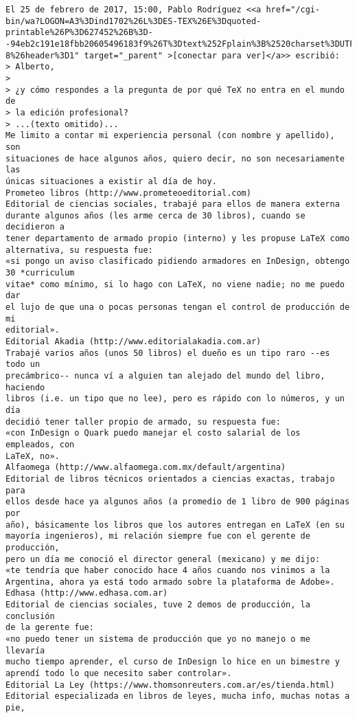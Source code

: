 \documentclass[a4paper,10pt]{article}
\begin{document}
\begin{lstlisting}
El 25 de febrero de 2017, 15:00, Pablo Rodríguez <<a href="/cgi-bin/wa?LOGON=A3%3Dind1702%26L%3DES-TEX%26E%3Dquoted-printable%26P%3D627452%26B%3D--94eb2c191e18fbb20605496183f9%26T%3Dtext%252Fplain%3B%2520charset%3DUTF-8%26header%3D1" target="_parent" >[conectar para ver]</a>> escribió:
> Alberto,
>
> ¿y cómo respondes a la pregunta de por qué TeX no entra en el mundo de
> la edición profesional?
> ...(texto omitido)...
Me limito a contar mi experiencia personal (con nombre y apellido), son
situaciones de hace algunos años, quiero decir, no son necesariamente las
únicas situaciones a existir al día de hoy.
Prometeo libros (http://www.prometeoeditorial.com)
Editorial de ciencias sociales, trabajé para ellos de manera externa
durante algunos años (les arme cerca de 30 libros), cuando se decidieron a
tener departamento de armado propio (interno) y les propuse LaTeX como
alternativa, su respuesta fue:
«si pongo un aviso clasificado pidiendo armadores en InDesign, obtengo
30 *curriculum
vitae* como mínimo, si lo hago con LaTeX, no viene nadie; no me puedo dar
el lujo de que una o pocas personas tengan el control de producción de mi
editorial».
Editorial Akadia (http://www.editorialakadia.com.ar)
Trabajé varios años (unos 50 libros) el dueño es un tipo raro --es todo un
precámbrico-- nunca ví a alguien tan alejado del mundo del libro, haciendo
libros (i.e. un tipo que no lee), pero es rápido con lo números, y un día
decidió tener taller propio de armado, su respuesta fue:
«con InDesign o Quark puedo manejar el costo salarial de los empleados, con
LaTeX, no».
Alfaomega (http://www.alfaomega.com.mx/default/argentina)
Editorial de libros técnicos orientados a ciencias exactas, trabajo para
ellos desde hace ya algunos años (a promedio de 1 libro de 900 páginas por
año), básicamente los libros que los autores entregan en LaTeX (en su
mayoría ingenieros), mi relación siempre fue con el gerente de producción,
pero un día me conoció el director general (mexicano) y me dijo:
«te tendría que haber conocido hace 4 años cuando nos vinimos a la
Argentina, ahora ya está todo armado sobre la plataforma de Adobe».
Edhasa (http://www.edhasa.com.ar)
Editorial de ciencias sociales, tuve 2 demos de producción, la conclusión
de la gerente fue:
«no puedo tener un sistema de producción que yo no manejo o me llevaría
mucho tiempo aprender, el curso de InDesign lo hice en un bimestre y
aprendí todo lo que necesito saber controlar».
Editorial La Ley (https://www.thomsonreuters.com.ar/es/tienda.html)
Editorial especializada en libros de leyes, mucha info, muchas notas a pie,

\end{lstlisting}
\end{document}
